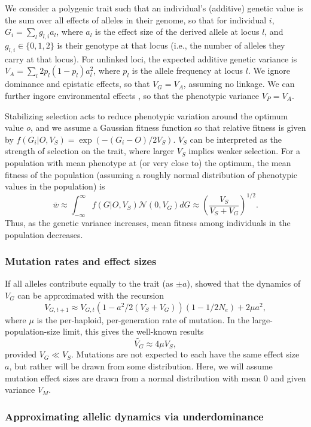 \documentclass{article}
\begin{document}
We consider a polygenic trait such that an individual's (additive) genetic
value is the sum over all effects of alleles in their genome, so that for
individual $i$, \(G_i = \sum_l g_{l, i} a_l\), where $a_l$ is the effect size
of the derived allele at locus $l$, and \(g_{l,i}\in\{0,1,2\}\) is their
genotype at that locus (i.e., the number of alleles they carry at that locus).
For unlinked loci, the expected additive genetic variance is \(V_A = \sum_l
2p_l(1-p_l)a_l^2\), where $p_l$ is the allele frequency at locus $l$. We ignore
dominance and epistatic effects, so that \(V_G = V_A\), assuming no linkage.
We can further ingore environmental effects \citep{simons2018population}, so
that the phenotypic variance \(V_P=V_A\).

Stabilizing selection acts to reduce phenotypic variation around the optimum
value $o$, and we assume a Gaussian fitness function so that relative fitness
is given by \(f(G_i | O, V_S) = \exp{(-(G_i - O) / 2 V_S)}\). $V_S$ can be
interpreted as the strength of selection on the trait, where larger $V_S$
implies weaker selection. For a population with mean phenotype at (or very
close to) the optimum, the mean fitness of the population (assuming a roughly
normal distribution of phenotypic values in the population) is
\[\bar{w} \approx \int_{-\infty}^\infty f(G | O, V_S) \mathcal{N}(0, V_G) dG
\approx \left(\frac{V_S}{V_S+V_G}\right)^{1/2}.\]
Thus, as the genetic variance increases, mean fitness among individuals in the
population decreases.

\subsubsection*{Mutation rates and effect sizes}

If all alleles contribute equally to the trait (as \(\pm a\)),
\citet{keightley1988quantitative} showed that the dynamics of $V_G$ can be
approximated with the recursion
\[V_{G,t+1} \approx V_{G,t}\left(1-a^2/2(V_S+V_G)\right)
\left(1-1/2N_e\right) + 2 \mu a^2,\]
where $\mu$ is the per-haploid, per-generation rate of mutation. In the
large-population-size limit, this gives the well-known results
\[\tilde{V_G} \approx 4\mu V_S,\] provided \(V_G \ll V_S\).
Mutations are not expected to each have the same effect size $a$, but
rather will be drawn from some distribution. Here, we will assume mutation
effect sizes are drawn from a normal distribution with mean 0 and given
variance $V_M$.

\subsubsection*{Approximating allelic dynamics via underdominance}
\end{document}
